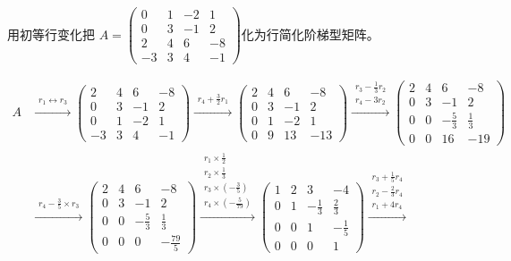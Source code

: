 \documentclass[a4paper]{report}
\begin{document}
\EX 用初等行变化把
$
A=
\begin{pmatrix}
0&1&-2&1\\
0&3&-1&2\\
2&4&6&-8\\
-3&3&4&-1
\end{pmatrix}
$化为行简化阶梯型矩阵。

\begin{jie}
\begin{align*}
A&\xrightarrow{\substack{r_{1}\leftrightarrow r_{3}}}
{
\begin{pmatrix}
2&4&6&-8\\
0&3&-1&2\\
0&1&-2&1\\
-3&3&4&-1
\end{pmatrix}
}\xrightarrow{\substack{r_{4}+\frac{3}{2} r_{1}}}
{
\begin{pmatrix}
2&4&6&-8\\
0&3&-1&2\\
0&1&-2&1\\
0&9&13&-13
\end{pmatrix}
}\xrightarrow{\substack{r_{3}-\frac{1}{3} r_{2} \\ r_{4}-3r_{2}}}
{
\begin{pmatrix}
2&4&6&-8\\
0&3&-1&2\\
0&0&-\frac{5}{3}&\frac{1}{3}\\
0&0&16&-19
\end{pmatrix}
}\\ &\xrightarrow{\substack{r_{4}-\frac{3}{5}\times r_{3}}}
{
\begin{pmatrix}
2&4&6&-8\\
0&3&-1&2\\
0&0&-\frac{5}{3}&\frac{1}{3}\\
0&0&0&-\frac{79}{5}
\end{pmatrix}
}\xrightarrow{\substack{r_{1}\times\frac{1}{2}\\ r_{2}\times\frac{1}{3}\\ r_{3}\times\left(-\frac{3}{5}\right)\\ r_{4}\times\left(-\frac{5}{79}\right)}}
{
\begin{pmatrix}
1&2&3&-4\\
0&1&-\frac{1}{3}&\frac{2}{3}\\
0&0&1&-\frac{1}{5}\\
0&0&0&1
\end{pmatrix}
}\xrightarrow{\substack{r_{3}+\frac{1}{5}r_{4}\\ r_{2}-\frac{2}{3}r_{4}\\ r_{1}+4r_{4}}}

\end{align*}
\end{jie}
\end{document}
